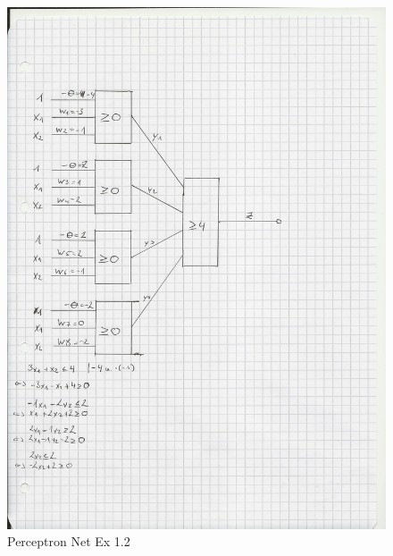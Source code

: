 \documentclass{scrartcl}
\begin{document}
\begin{figure}[ht]
\begin{center}
\includegraphics[scale=0.3]{Attachment4.jpg}
\end{center}
\caption{Perceptron Net Ex 1.2}
\label{Img:Exercise 1.2}
\end{figure}
\end{document}
